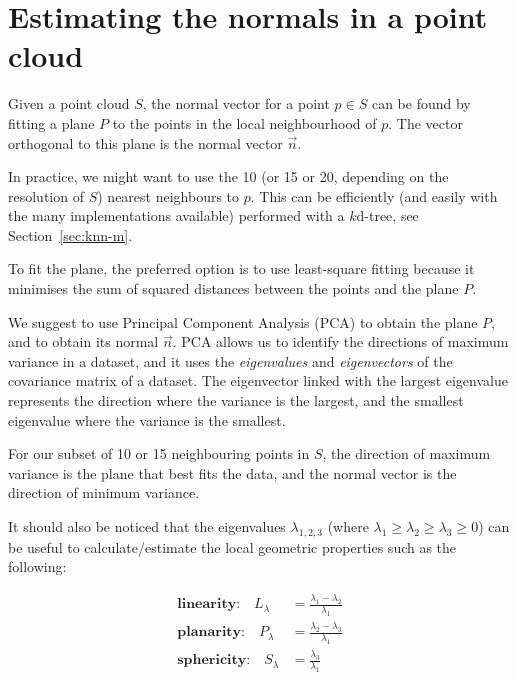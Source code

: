 
\graphicspath{{appendices/normalplane/figs/}}

\chapter{Estimating the normals in a point cloud}%
\label{app:normalplane}

Given a point cloud $S$, the normal vector for a point $p \in S$ can be found by fitting a plane $P$ to the points in the local neighbourhood of $p$. 
The vector orthogonal to this plane is the normal vector $\vec{n}$.

In practice, we might want to use the 10 (or 15 or 20, depending on the resolution of $S$) nearest neighbours to $p$.
This can be efficiently (and easily with the many implementations available) performed with a $k$d-tree, see Section~\ref{sec:knn-m}.

To fit the plane, the preferred option is to use least-square fitting because it minimises the sum of squared distances between the points and the plane $P$.

We suggest to use Principal Component Analysis (PCA) to obtain the plane $P$, and to obtain its normal $\vec{n}$.
PCA allows us to identify the directions of maximum variance in a dataset, and it uses the \emph{eigenvalues} and \emph{eigenvectors} of the covariance matrix of a dataset.
%
The eigenvector linked with the largest eigenvalue represents the direction where the variance is the largest, and the smallest eigenvalue where the variance is the smallest.

%

For our subset of 10 or 15 neighbouring points in $S$, the direction of maximum variance is the plane that best fits the data, and the normal vector is the direction of minimum variance.


It should also be noticed that the eigenvalues $\lambda_{1,2,3}$ (where $\lambda_1 \geq \lambda_2 \geq \lambda_3 \geq 0$) can be useful to calculate/estimate the local geometric properties such as the following:

\begin{equation}
\begin{aligned}
\textbf{linearity:} \quad L_\lambda &= \frac{\lambda_1 - \lambda_2}{\lambda_1} \\
\textbf{planarity:} \quad P_\lambda &= \frac{\lambda_2 - \lambda_3}{\lambda_1} \\
\textbf{sphericity:} \quad S_\lambda &= \frac{\lambda_3}{\lambda_1} \\
\end{aligned}
\end{equation}


